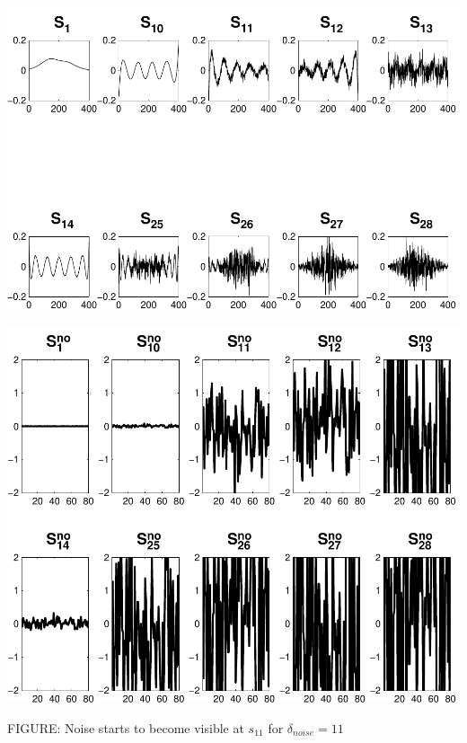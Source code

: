\documentclass[11pt]{amsart}
\begin{document}
	\vspace{5mm}
	\begin{minipage}[t]{0.5\textwidth}
	
		\includegraphics[width=.95\linewidth]{figures/run2/sk_plots} 
   
	\end{minipage}
	\begin{minipage}[t]{0.5\textwidth}
	
		\includegraphics[width=.75\linewidth]{figures/run2/noise_parts} 
   
	\end{minipage}
	\begin{center}
		FIGURE: 
		Noise starts to become visible at $s_{11}$ for $\delta_{noise}=11$
	\end{center} 
	\vspace{5mm}
	
\end{document}
